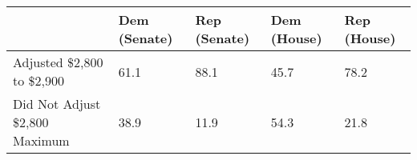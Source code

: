 \begin{tabular}{lllll}
  \toprule
  & Dem (Senate) & Rep (Senate) & Dem (House) & Rep (House) \\ 
  \midrule
Adjusted \$2,800 to \$2,900 & 61.1 & 88.1 & 45.7 & 78.2 \\ 
  Did Not Adjust \$2,800 Maximum & 38.9 & 11.9 & 54.3 & 21.8 \\ 
   \bottomrule
\end{tabular}
